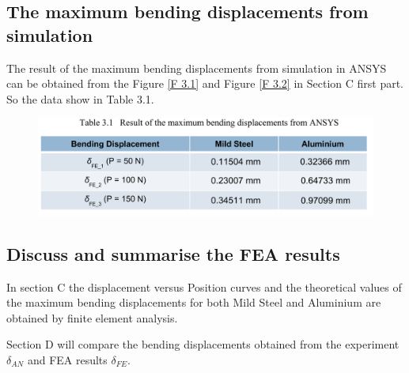 \subsection{The maximum bending displacements from simulation}
The result of the maximum bending displacements from simulation in ANSYS can be obtained from the Figure \ref{F 3.1} and Figure \ref{F 3.2} in Section C first part. So the data show in Table 3.1.
 \begin{figure}[htp]
 		\centering
 		\includegraphics[width=1.0\linewidth]{Results_and_discussion/Figure/RESULT form ANSYS}
 		\caption*{}
 		\label{T 3.1}
 \end{figure}

\subsection{Discuss and summarise the FEA results}
In section C the displacement versus Position curves and the theoretical values of the maximum bending displacements for both Mild Steel and Aluminium are obtained by finite element analysis. 

	Section D will compare the bending displacements obtained from the experiment $\delta _{AN}$ and FEA results $\delta _{FE}$.